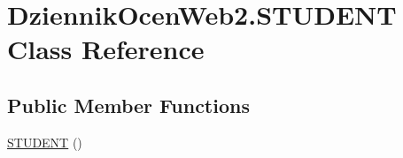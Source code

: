 \hypertarget{class_dziennik_ocen_web2_1_1_s_t_u_d_e_n_t}{}\section{Dziennik\+Ocen\+Web2.\+S\+T\+U\+D\+E\+NT Class Reference}
\label{class_dziennik_ocen_web2_1_1_s_t_u_d_e_n_t}
\subsection*{Public Member Functions}
\begin{DoxyCompactItemize}
\item 
\hyperlink{class_dziennik_ocen_web2_1_1_s_t_u_d_e_n_t_a7d0f129310b3e49e439acc4405a538c6}{S\+T\+U\+D\+E\+NT} ()
\end{DoxyCompactItemize}
